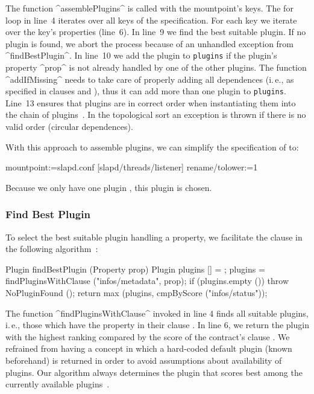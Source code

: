 The function ^assemblePlugins^ is called with the mountpoint's keys.
The for loop in line~4 iterates over all keys of the specification.
For each key we iterate over the key's properties (line~6).
In line~9 we find the best suitable plugin.
If no plugin is found, we abort the process because of an unhandled exception from ^findBestPlugin^.
In line~10 we add the plugin  to \lstinline[language=Cpp]^plugins^ if the plugin's property ^prop^ is not already handled by one of the other plugins.
The function ^addIfMissing^ needs to take care of properly adding all dependences (i.\,e., as specified in clauses  and ), thus it can add more than one plugin to \texttt{plugins}.
Line~13 ensures that plugins are in correct order when instantiating them into the chain of plugins~\cite{kahn1962topological,raab2016improving}.
In the topological sort an exception is thrown if there is no valid order (circular dependences).

\begin{example}
With this approach to assemble plugins, we can simplify the specification of  to:

\begin{code}[morekeywords={rename,tolower}]
[slapd]
  mountpoint:=slapd.conf
[slapd/threads/listener]
  rename/tolower:=1
\end{code}

Because we only have one plugin , this plugin is chosen.
\end{example}


\subsubsection{Find Best Plugin}
\label{sec:find-best-plugin}

To select the best suitable plugin handling a property, we facilitate the clause  in the following algorithm~\cite{raab2016improving}:

\label{alg:find-best-plugin}
\begin{code}[language = C++]
Plugin findBestPlugin (Property prop)
{
	Plugin plugins [] = {};
	plugins = findPluginsWithClause ("infos/metadata", prop);
	if (plugins.empty ()) throw NoPluginFound ();
	return max (plugins, cmpByScore ("infos/status"));
}
\end{code}

The function ^findPluginsWithClause^ invoked in line 4 finds all suitable plugins, i.\,e., those which have the property  in their clause .
In line 6, we return the plugin with the highest ranking compared by the score of the contract's clause .
We refrained from having a concept in which a hard-coded default plugin (known beforehand) is returned in order to avoid assumptions about availability of plugins.
Our algorithm always determines the plugin that scores best among the currently available plugins~\cite{raab2016improving}.

